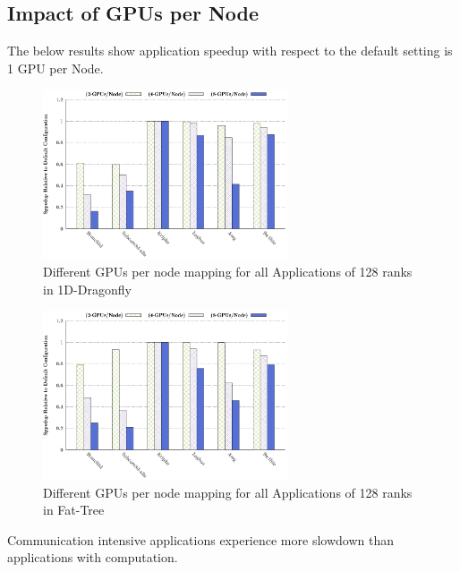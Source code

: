 \documentclass[conference]{IEEEtran}
\begin{document}
\subsection{Impact of GPUs per Node}\label{AA}
The below results show application speedup with respect to the default setting is 1 GPU per Node. 
\begin{figure}[H]
\centering
\centering
\includegraphics[width=1\linewidth, height=5cm]{figs/dfly-x-mapping-all.eps}
\caption{Different GPUs per node mapping for all Applications of 128 ranks in 1D-Dragonfly}
\end{figure}

\begin{figure}[H]
\centering
\centering
\includegraphics[width=1\linewidth, height=5cm]{figs/ftree-x-mapping-all.eps}
\caption{Different GPUs per node mapping for all Applications of 128 ranks in Fat-Tree}
\end{figure}

Communication intensive applications experience more slowdown than applications with computation.
\end{document}
